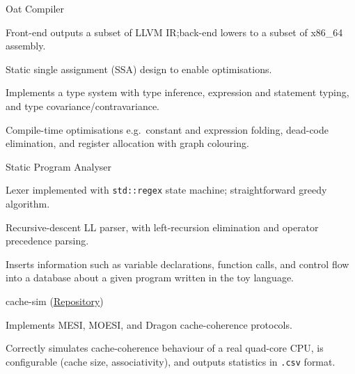 \begin{cventries}
	{Oat Compiler} %
	{} %
	{} %
	{
		\begin{cvitems} %
			\item Front-end outputs a subset of LLVM IR;\@ back-end lowers to a subset of x86\_64 assembly.
			\item Static single assignment (SSA) design to enable optimisations.
			\item Implements a type system with type inference, expression and statement typing, and type covariance/contravariance.
			\item Compile-time optimisations e.g.\ constant and expression folding, dead-code elimination, and register allocation with graph colouring.
		\end{cvitems}
	}

	{Static Program Analyser} %
	{} %
	{} %
	{
		\begin{cvitems} %
			\item Lexer implemented with \texttt{std::regex} state machine; straightforward greedy algorithm.
			\item Recursive-descent LL parser, with left-recursion elimination and operator precedence parsing.
			\item Inserts information such as variable declarations, function calls, and control flow into a database about a given program written in the toy language.
		\end{cvitems}
	}


	{cache-sim \footnotesize(\href{https://github.com/sharadhr/cs4223-cache-sim}{Repository})} %
	{} %
	{} %
	{
		\begin{cvitems} %
			\item Implements MESI, MOESI, and Dragon cache-coherence protocols.
			\item Correctly simulates cache-coherence behaviour of a real quad-core CPU, is configurable (cache size, associativity), and outputs statistics in \texttt{.csv} format.
		\end{cvitems}
	}

\end{cventries}

